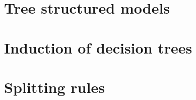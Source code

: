 
\section{Tree structured models}
\label{sec:3:tree-structured-models}


\section{Induction of decision trees}
\label{sec:3:induction}


\section{Splitting rules}
\label{sec:3:splitting-rules}


